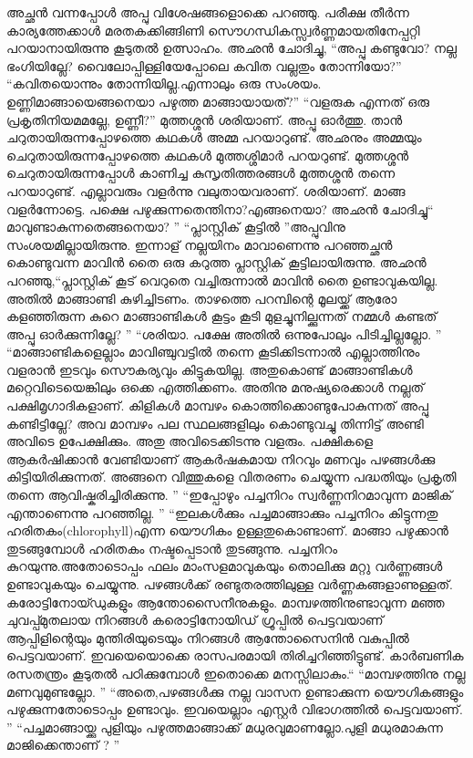 അച്ഛൻ വന്നപ്പോൾ അപ്പു വിശേഷങ്ങളൊക്കെ പറഞ്ഞു. പരീക്ഷ തീർന്ന കാര്യത്തേക്കാൾ മരതകക്കിങ്ങിണി സൌഗന്ധികസ്സ്വർണ്ണമായതിനേപ്പറ്റി പറയാനായിരുന്നു കൂടുതൽ ഉത്സാഹം.
അഛൻ ചോദിച്ചു, ``അപ്പു കണ്ടുവോ? നല്ല ഭംഗിയില്ലേ? വൈലോപ്പിള്ളിയേപ്പോലെ കവിത വല്ലതും തോന്നിയോ?''
``കവിതയൊന്നും തോന്നിയില്ല.എന്നാലും ഒരു സംശയം. ഉണ്ണിമാങ്ങായെങ്ങനെയാ പഴുത്ത മാങ്ങായായത്?''
``വളരുക എന്നത് ഒരു പ്രകൃതിനിയമമല്ലേ, ഉണ്ണീ?'' മുത്തശ്ശൻ
 ശരിയാണ്‌. അപ്പു ഓർത്തു. താൻ ചറുതായിരുന്നപ്പോഴത്തെ കഥകൾ അമ്മ പറയാറുണ്ട്. അഛനും അമ്മയും ചെറുതായിരുന്നപ്പോഴത്തെ കഥകൾ മുത്തശ്ശിമാർ പറയറുണ്ട്. മുത്തശ്ശൻ ചെറുതായിരുന്നപ്പോൾ കാണിച്ച കുസൃതിത്തരങ്ങൾ മുത്തശ്ശൻ തന്നെ പറയാറുണ്ട്. എല്ലാവരും വളർന്നു വലുതായവരാണ്‌. ശരിയാണ്‌.  മാങ്ങ വളർന്നോട്ടെ. പക്ഷെ പഴുക്കുന്നതെന്തിനാ?എങ്ങനെയാ?
അഛൻ ചോദിച്ചു`` മാവുണ്ടാകുന്നതെങ്ങനെയാ? ''
``പ്ലാസ്റ്റിക് കൂട്ടിൽ ''അപ്പുവിനു സംശയമില്ലായിരുന്നു. ഇന്നാള് നല്ലയിനം മാവാണെന്നു പറഞ്ഞച്ഛൻ കൊണ്ടുവന്ന മാവിൻ തൈ ഒരു കറുത്ത പ്ലാസ്റ്റിക് കൂട്ടിലായിരുന്നു.
അഛൻ പറഞ്ഞു,``പ്ലാസ്റ്റിക് കൂട് വെറുതെ വച്ചിരുന്നാൽ മാവിൻ തൈ ഉണ്ടാവുകയില്ല. അതിൽ മാങ്ങാണ്ടി കുഴിച്ചിടണം. താഴത്തെ പറമ്പിന്റെ മൂലയ്ക്ക് ആരോ കളഞ്ഞിരുന്ന കുറെ മാങ്ങാണ്ടികൾ കൂട്ടം കൂടി മുളച്ചുനില്ക്കുന്നത് നമ്മൾ കണ്ടത് അപ്പു ഓർക്കുന്നില്ലേ? ''
``ശരിയാ. പക്ഷേ അതിൽ ഒന്നുപോലും പിടിച്ചില്ലല്ലോ. ''
``മാങ്ങാണ്ടികളെല്ലാം മാവിഞ്ചുവട്ടിൽ തന്നെ കൂടിക്കിടന്നാൽ എല്ലാത്തിനും വളരാൻ ഇടവും സൌകര്യവും കിട്ടുകയില്ല. അതുകൊണ്ട് മാങ്ങാണ്ടികൾ മറ്റെവിടെയെങ്കിലും ഒക്കെ എത്തിക്കണം. അതിനു മനുഷ്യരെക്കാൾ നല്ലത് പക്ഷിമൃഗാദികളാണ്‌. കിളികൾ മാമ്പഴം കൊത്തിക്കൊണ്ടുപോകുന്നത് അപ്പു കണ്ടിട്ടില്ലേ? അവ മാമ്പഴം പല സ്ഥലങ്ങളിലും കൊണ്ടുവച്ചു തിന്നിട്ട് അണ്ടി അവിടെ ഉപേക്ഷിക്കും. അതു അവിടെക്കിടന്നു വളരും. പക്ഷികളെ ആകർഷിക്കാൻ വേണ്ടിയാണ്‌ ആകർഷകമായ നിറവും മണവും പഴങ്ങൾക്കു കിട്ടിയിരിക്കുന്നത്. അങ്ങനെ വിത്തുകളെ വിതരണം ചെയ്യുന്ന പദ്ധതിയും പ്രകൃതി തന്നെ ആവിഷ്കരിച്ചിരിക്കുന്നു. ''
``ഇപ്പോഴും പച്ചനിറം സ്വർണ്ണനിറമാവുന്ന മാജിക് എന്താണെന്നു പറഞ്ഞില്ല. ''
``ഇലകൾക്കും പച്ചമാങ്ങാക്കും പച്ചനിറം കിട്ടുന്നതു ഹരിതകം(chlorophyll)എന്ന യൌഗികം ഉള്ളതുകൊണ്ടാണ്‌. മാങ്ങാ പഴുക്കാൻ തുടങ്ങുമ്പോൾ ഹരിതകം നഷ്ടപ്പെടാൻ തുടങ്ങുന്നു. പച്ചനിറം കുറയുന്നു.അതോടൊപ്പം ഫലം മാംസളമാവുകയും തൊലിക്കു മറ്റു വർണ്ണങ്ങൾ ഉണ്ടാവുകയും ചെയ്യുന്നു. പഴങ്ങൾക്ക് രണ്ടുതരത്തിലുള്ള വർണ്ണകങ്ങളാണുള്ളത്. കരോട്ടിനോയ്ഡുകളും ആന്തോസൈനീനുകളും. മാമ്പഴത്തിനുണ്ടാവുന്ന മഞ്ഞ ചുവപ്പ്മുതലായ നിറങ്ങൾ കരൊട്ടിനോയിഡ് ഗ്രൂപ്പിൽ പെട്ടവയാണ് ആപ്പിളിന്റെയും മുന്തിരിയുടെയും നിറങ്ങൾ ആന്തോസൈനിൻ വകുപ്പിൽ പെട്ടവയാണ്‌. ഇവയെയൊക്കെ രാസപരമായി തിരിച്ചറിഞ്ഞിട്ടുണ്ട്. കാർബണിക രസതന്ത്രം കൂടുതൽ പഠിക്കുമ്പോൾ ഇതൊക്കെ മനസ്സിലാകും.``
``മാമ്പഴത്തിനു നല്ല മണവുമുണ്ടല്ലോ. ''
``അതെ,പഴങ്ങൾക്കു നല്ല വാസന ഉണ്ടാക്കുന്ന യൌഗികങ്ങളും പഴുക്കുന്നതോടൊപ്പം ഉണ്ടാവും. ഇവയെല്ലാം എസ്റ്റർ വിഭാഗത്തിൽ പെട്ടവയാണ്‌. ''
``പച്ചമാങ്ങായ്ക്കു പുളിയും പഴുത്തമാങ്ങാക്ക് മധുരവുമാണല്ലോ.പുളി മധുരമാകുന്ന മാജിക്കെന്താണ് ? ''

